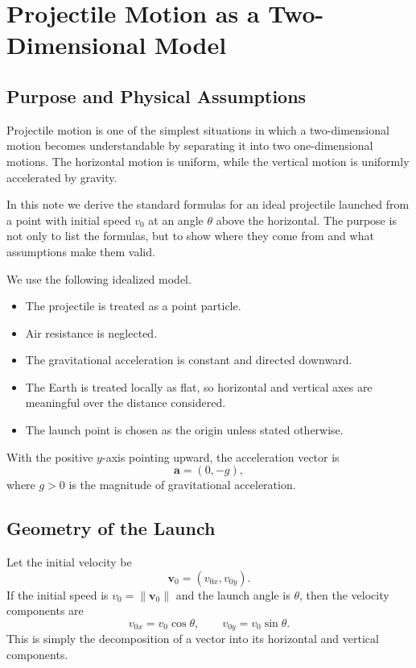 \chapter{Projectile Motion as a Two-Dimensional Model}

\section{Purpose and Physical Assumptions}

Projectile motion is one of the simplest situations in which a two-dimensional
motion becomes understandable by separating it into two one-dimensional motions.
The horizontal motion is uniform, while the vertical motion is uniformly
accelerated by gravity.

In this note we derive the standard formulas for an ideal projectile launched
from a point with initial speed \(v_0\) at an angle \(\theta\) above the
horizontal. The purpose is not only to list the formulas, but to show where they
come from and what assumptions make them valid.

We use the following idealized model.

\begin{itemize}
    \item The projectile is treated as a point particle.
    \item Air resistance is neglected.
    \item The gravitational acceleration is constant and directed downward.
    \item The Earth is treated locally as flat, so horizontal and vertical axes
    are meaningful over the distance considered.
    \item The launch point is chosen as the origin unless stated otherwise.
\end{itemize}

With the positive \(y\)-axis pointing upward, the acceleration vector is
\[
\mathbf{a}=(0,-g),
\]
where \(g>0\) is the magnitude of gravitational acceleration.

\section{Geometry of the Launch}

Let the initial velocity be
\[
\mathbf{v}_0=(v_{0x},v_{0y}).
\]
If the initial speed is \(v_0=\lVert \mathbf{v}_0\rVert\) and the launch angle is
\(\theta\), then the velocity components are
\[
v_{0x}=v_0\cos\theta,
\qquad
v_{0y}=v_0\sin\theta.
\]
This is simply the decomposition of a vector into its horizontal and vertical
components.

